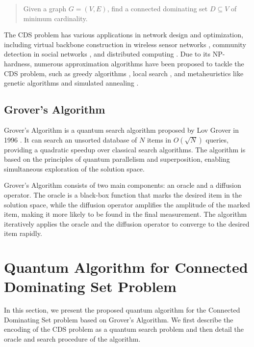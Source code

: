\begin{quote}
    Given a graph $G = (V, E)$, find a connected dominating set $D \subseteq V$ of minimum cardinality.
\end{quote}

The CDS problem has various applications in network design and optimization, including virtual backbone construction in wireless sensor networks \cite{du2005connected}, community detection in social networks \cite{fortunato2010community}, and distributed computing \cite{lin2007complexity}. Due to its NP-hardness, numerous approximation algorithms have been proposed to tackle the CDS problem, such as greedy algorithms \cite{wan2004fast}, local search \cite{clark1990unit}, and metaheuristics like genetic algorithms \cite{garey1979computers} and simulated annealing \cite{zhang2002simulated}.

\subsection{Grover's Algorithm}
Grover's Algorithm is a quantum search algorithm proposed by Lov Grover in 1996 \cite{grover1996fast}. It can search an unsorted database of $N$ items in $O(\sqrt{N})$ queries, providing a quadratic speedup over classical search algorithms. The algorithm is based on the principles of quantum parallelism and superposition, enabling simultaneous exploration of the solution space.

Grover's Algorithm consists of two main components: an oracle and a diffusion operator. The oracle is a black-box function that marks the desired item in the solution space, while the diffusion operator amplifies the amplitude of the marked item, making it more likely to be found in the final measurement. The algorithm iteratively applies the oracle and the diffusion operator to converge to the desired item rapidly.

\section{Quantum Algorithm for Connected Dominating Set Problem}\label{sec:algorithm}
In this section, we present the proposed quantum algorithm for the Connected Dominating Set problem based on Grover's Algorithm. We first describe the encoding of the CDS problem as a quantum search problem and then detail the oracle and search procedure of the algorithm.


